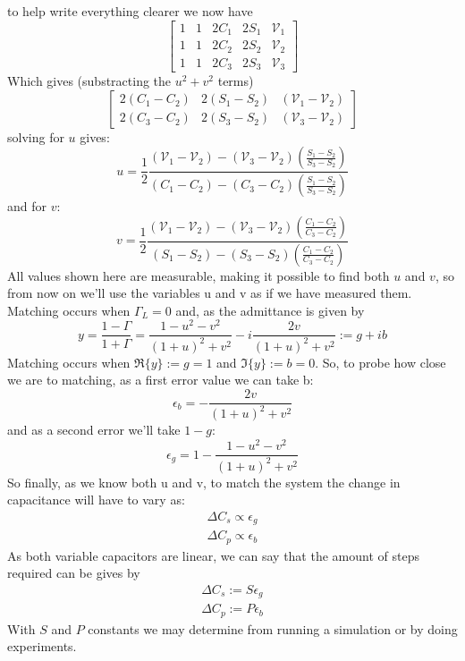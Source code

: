 to help write everything clearer we now have
\begin{equation*}
	\begin{bmatrix}
		1 & 1 & 2C_1 & 2S_1 & \mathcal{V}_1\\
		1 & 1 & 2C_2 & 2S_2 & \mathcal{V}_2\\
		1 & 1 & 2C_3 & 2S_3 & \mathcal{V}_3
	\end{bmatrix}
\end{equation*}
Which gives (substracting the $u^2 + v^2$ terms)
\begin{equation*}
	\begin{bmatrix}
		2(C_1 - C_2) & 2(S_1 - S_2) & (\mathcal{V}_1 - \mathcal{V}_2)\\
		2(C_3 - C_2) & 2(S_3 - S_2) & (\mathcal{V}_3 - \mathcal{V}_2)
	\end{bmatrix}
\end{equation*}
solving for $u$ gives:
\begin{equation}
	\boxed{u = \frac{1}{2}\frac{(\mathcal{V}_1 - \mathcal{V}_2) - (\mathcal{V}_3 - \mathcal{V}_2)\left( \frac{S_1 - S_2}{S_3 - S_2}  \right)}{(C_1 - C_2) - (C_3 - C_2)\left( \frac{S_1 - S_2}{S_3 - S_2}  \right)}}
\end{equation}
and for $v$:
\begin{equation}
	\boxed{v = \frac{1}{2}\frac{(\mathcal{V}_1 - \mathcal{V}_2) - (\mathcal{V}_3 - \mathcal{V}_2)\left( \frac{C_1 - C_2}{C_3 - C_2}  \right)}{(S_1 - S_2) - (S_3 - S_2)\left( \frac{C_1 - C_2}{C_3 - C_2}  \right)}}
\end{equation}
All values shown here are measurable, making it possible to find both $u$ and $v$, so from now on we'll use the variables u and v as if
we have measured them.\\

Matching occurs when $\Gamma_L= 0$ and, as the admittance is given by
\begin{equation}
	y = \frac{1 - \Gamma}{1 + \Gamma} = \frac{1 - u^2 - v^2}{(1+u)^2 + v^2} - i\frac{2v}{(1+u)^2 + v^2} := g + ib
\end{equation}
Matching occurs when $\Re\{y\} := g = 1$ and $\Im\{y\} := b = 0$. So, to probe how close we are to matching, as a first error value we can take b:
\begin{equation}
	\boxed{\epsilon_b = -\frac{2v}{(1+u)^2 + v^2}}
\end{equation}
and as a second error we'll take $1-g$:
\begin{equation}
	\boxed{\epsilon_g = 1 - \frac{1 - u^2 - v^2}{(1+u)^2 + v^2}}
\end{equation}
So finally, as we know both u and v, to match the system the change in capacitance will have to vary as:
\begin{eqnarray}
	\Delta C_s \propto \epsilon_g\\
	\Delta C_p \propto \epsilon_b
\end{eqnarray}
As both variable capacitors are linear, we can say that the amount of steps required can be gives by
\begin{eqnarray}
	\Delta C_s := S\epsilon_g\\
	\Delta C_p := P\epsilon_b
\end{eqnarray}
With $S$ and $P$ constants we may determine from running a simulation or by doing experiments.
